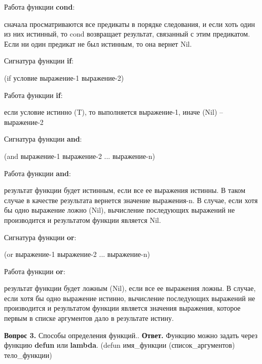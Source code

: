 \documentclass[12pt]{report}
\begin{document}
\indent Работа функции \textbf{cond}: 

сначала просматриваются все предикаты в порядке следования, и если хоть один из них истинный, то cond возвращает результат, связанный с этим предикатом. Если ни один предикат не был истинным, то она вернет Nil. 

Сигнатура функции \textbf{if}: 

(if условие выражение-1 выражение-2)\newline

\indent Работа функции \textbf{if}: 

если условие истинно (T), то выполняется выражение-1, иначе (Nil) – выражение-2\newline

Сигнатура функции \textbf{and}: 

(and выражение-1 выражение-2 ... выражение-n)\newline

\indent Работа функции \textbf{and}: 

результат функции будет истинным, если все ее выражения истинны. В таком случае в качестве результата вернется значение выражения-n. В случае, если хотя бы одно выражение ложно (Nil), вычисление последующих выражений не производится и результатом функции является Nil.\newline

Сигнатура функции \textbf{or}: 

(or выражение-1 выражение-2 ... выражение-n)\newline

Работа функции \textbf{or}: 

результат функции будет ложным (Nil), если все ее выражения ложны. В случае, если хотя бы одно выражение истинно, вычисление последующих выражений не производится и результатом функции является значения выражения, которое первым в списке аргументов дало в результате истину.\newline

\textbf{Вопрос 3.} Способы определения функций..\newline
\indent\textbf{Ответ.} Функцию можно задать через функцию \textbf{defun} или \textbf{lambda}. (defun имя\_функции (список\_аргументов) тело\_функции)
	
	
	
	
\end{document}
